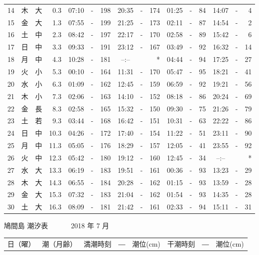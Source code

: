 \documentclass[12pt.a4j]{jsarticle}
\begin{document}
\begin{center}
\begin{table}[ht]
\begin{tabular}{|rc|cr|ccrccr|ccrccr|}
14 & 木 & 大 &  0.3 & 07:10 &-& 198 & 20:35 &-& 174 & 01:25 &-&  84 & 14:07 &-&   4 \\
15 & 金 & 大 &  1.3 & 07:55 &-& 199 & 21:25 &-& 173 & 02:11 &-&  87 & 14:54 &-&   2 \\
16 & 土 & 中 &  2.3 & 08:42 &-& 197 & 22:17 &-& 170 & 02:58 &-&  89 & 15:42 &-&   6 \\
17 & 日 & 中 &  3.3 & 09:33 &-& 191 & 23:12 &-& 167 & 03:49 &-&  92 & 16:32 &-&  14 \\
18 & 月 & 中 &  4.3 & 10:28 &-& 181 & --:-- & &  *  & 04:44 &-&  94 & 17:25 &-&  27 \\
19 & 火 & 小 &  5.3 & 00:10 &-& 164 & 11:31 &-& 170 & 05:47 &-&  95 & 18:21 &-&  41 \\
20 & 水 & 小 &  6.3 & 01:09 &-& 162 & 12:45 &-& 159 & 06:59 &-&  92 & 19:21 &-&  56 \\
21 & 木 & 小 &  7.3 & 02:06 &-& 163 & 14:10 &-& 152 & 08:18 &-&  86 & 20:24 &-&  69 \\
22 & 金 & 長 &  8.3 & 02:58 &-& 165 & 15:32 &-& 150 & 09:30 &-&  75 & 21:26 &-&  79 \\
23 & 土 & 若 &  9.3 & 03:44 &-& 168 & 16:42 &-& 151 & 10:31 &-&  63 & 22:22 &-&  86 \\
24 & 日 & 中 & 10.3 & 04:26 &-& 172 & 17:40 &-& 154 & 11:22 &-&  51 & 23:11 &-&  90 \\
25 & 月 & 中 & 11.3 & 05:05 &-& 176 & 18:29 &-& 157 & 12:05 &-&  41 & 23:55 &-&  92 \\
26 & 火 & 中 & 12.3 & 05:42 &-& 180 & 19:12 &-& 160 & 12:45 &-&  34 & --:-- & &  *  \\
27 & 水 & 大 & 13.3 & 06:19 &-& 183 & 19:51 &-& 161 & 00:36 &-&  93 & 13:23 &-&  29 \\
28 & 木 & 大 & 14.3 & 06:55 &-& 184 & 20:28 &-& 162 & 01:15 &-&  93 & 13:59 &-&  28 \\
29 & 金 & 大 & 15.3 & 07:32 &-& 183 & 21:04 &-& 162 & 01:54 &-&  93 & 14:35 &-&  28 \\
30 & 土 & 大 & 16.3 & 08:09 &-& 181 & 21:42 &-& 161 & 02:33 &-&  94 & 15:11 &-&  31 \\
\hline
\end{tabular}
\end{table}
\newpage
{\LARGE 鳩間島  潮汐表　　　}
{\large 2018 年  7 月}\\
\begin{table}[ht]
\begin{tabular}{|rc|cr|ccrccr|ccrccr|}
\hline
\multicolumn{2}{|c|}{日（曜）} & \multicolumn{2}{c|}{潮（月齢）} & \multicolumn{6}{c|}{満潮時刻　―　潮位(cm)} & \multicolumn{6}{c|}{干潮時刻　―　潮位(cm)} \\

\end{tabular}
\end{table}
\end{center}
\end{document}

